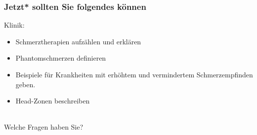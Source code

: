 \documentclass{beamer}
\begin{document}
\begin{frame}


 \frametitle{Jetzt* sollten Sie folgendes können}
 

\begin{block}{Klinik:}

\begin{itemize}
    
\item 
Schmerztherapien aufzählen und erklären
    \item 
     Phantomschmerzen definieren
    \item 
 Beispiele für Krankheiten mit erhöhtem und vermindertem Schmerzempfinden geben. 
\item
Head-Zonen beschreiben

\end{itemize}


\end{block}


$\,$\\[1cm]
\textcolor{theme}{Welche Fragen haben Sie?}


\end{frame}


\end{document}
